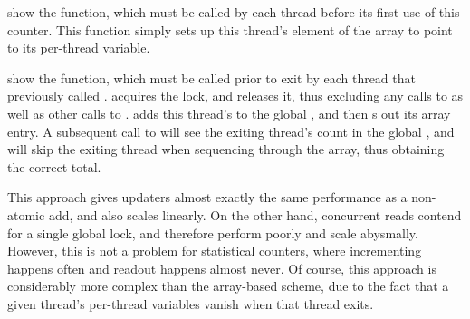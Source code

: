 \begin{fcvref}
 show the 
function, which
must be called by each thread before its first use of this counter.
This function simply sets up this thread's element of the 
array to point to its per-thread  variable.
\end{fcvref}

\QuickQuizEnd

\begin{fcvref}
 show the 
function, which
must be called prior to exit by each thread that previously called
.
 acquires the lock, and
 releases it, thus excluding any
calls to  as well as other calls to
.
 adds this thread's  to the global
,
and then  s out its  array entry.
A subsequent call to  will see the exiting thread's
count in the global , and will skip the exiting thread
when sequencing through the  array, thus obtaining
the correct total.
\end{fcvref}

This approach gives updaters almost exactly the same performance as
a non-atomic add, and also scales linearly.
On the other hand, concurrent reads contend for a single global lock,
and therefore perform poorly and scale abysmally.
However, this is not a problem for statistical counters, where incrementing
happens often and readout happens almost never.
Of course, this approach is considerably more complex than the
array-based scheme, due to the fact that a given thread's per-thread
variables vanish when that thread exits.

